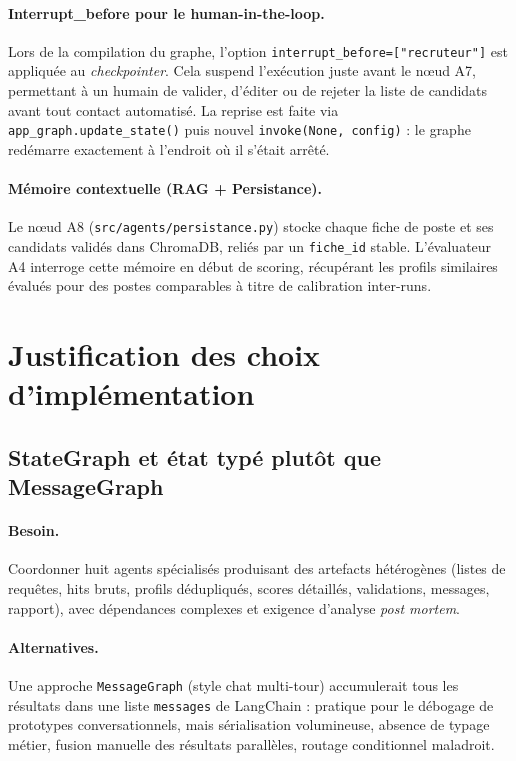 \paragraph{Interrupt\_before pour le human-in-the-loop.}
Lors de la compilation du graphe, l'option \texttt{interrupt\_before=["recruteur"]} est appliquée au \textit{checkpointer}. Cela suspend l'exécution juste avant le nœud A7, permettant à un humain de valider, d'éditer ou de rejeter la liste de candidats avant tout contact automatisé. La reprise est faite via \texttt{app\_graph.update\_state()} puis nouvel \texttt{invoke(None, config)} : le graphe redémarre exactement à l'endroit où il s'était arrêté.

\paragraph{Mémoire contextuelle (RAG + Persistance).}
Le nœud A8 (\texttt{src/agents/persistance.py}) stocke chaque fiche de poste et ses candidats validés dans ChromaDB, reliés par un \texttt{fiche\_id} stable. L'évaluateur A4 interroge cette mémoire en début de scoring, récupérant les profils similaires évalués pour des postes comparables à titre de calibration inter-runs.

\section{Justification des choix d'implémentation}

\subsection{StateGraph et état typé plutôt que MessageGraph}

\paragraph{Besoin.} Coordonner huit agents spécialisés produisant des artefacts hétérogènes (listes de requêtes, hits bruts, profils dédupliqués, scores détaillés, validations, messages, rapport), avec dépendances complexes et exigence d'analyse \textit{post mortem}.

\paragraph{Alternatives.} Une approche \texttt{MessageGraph} (style chat multi-tour) accumulerait tous les résultats dans une liste \texttt{messages} de LangChain : pratique pour le débogage de prototypes conversationnels, mais sérialisation volumineuse, absence de typage métier, fusion manuelle des résultats parallèles, routage conditionnel maladroit.

